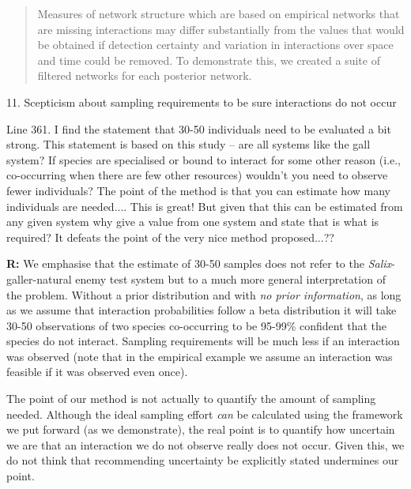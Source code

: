 \documentclass[12pt]{letter}
\newenvironment{refquote}{\bigskip \begin{it}}{\end{it}\smallskip}
\begin{document}
		\begin{quotation}
			Measures of network structure which are based on empirical networks that are missing interactions may differ substantially from the values that would be obtained if detection certainty and variation in interactions over space and time could be removed. To demonstrate this, we created a suite of filtered networks for each posterior network. 
		\end{quotation}


	11. Scepticism about sampling requirements to be sure interactions do not occur 


		\begin{refquote}
		Line 361.  I find the statement that 30-50 individuals need to be evaluated a bit strong.  This statement is based on this study – are all systems like the gall system?  If species are specialised or bound to interact for some other reason (i.e., co-occurring when there are few other resources) wouldn't you need to observe fewer individuals?  The point of the method is that you can estimate how many individuals are needed.... This is great!  But given that this can be estimated from any given system why give a value from one system and state that is what is required?  It defeats the point of the very nice method proposed...??
		\end{refquote}


		\textbf{R:} 
		We emphasise that the estimate of 30-50 samples does not refer to the \emph{Salix}-galler-natural enemy test system but to a much more general interpretation of the problem. Without a prior distribution and with \emph{no prior information}, as long as we assume that interaction probabilities follow a beta distribution it will take 30-50 observations of two species co-occurring to be 95-99\% confident that the species do not interact. Sampling requirements will be much less if an interaction was observed (note that in the empirical example we assume an interaction was feasible if it was observed even once).


		The point of our method is not actually to quantify the amount of sampling needed. Although the ideal sampling effort \emph{can} be calculated using the framework we put forward (as we demonstrate), the real point is to quantify how uncertain we are that an interaction we do not observe really does not occur. Given this, we do not think that recommending uncertainty be explicitly stated undermines our point. 
\end{document}
